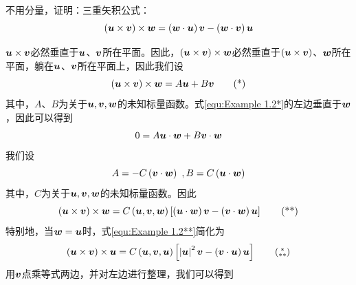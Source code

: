 \begin{example}
    不用分量，证明：三重矢积公式：
    \begin{equation}\label{equ:1.22}
        \left( \boldsymbol{u}\times \boldsymbol{v} \right) \times \boldsymbol{w}=\left( \boldsymbol{w}\cdot \boldsymbol{u} \right) \boldsymbol{v}-\left( \boldsymbol{w}\cdot \boldsymbol{v} \right) \boldsymbol{u}
    \end{equation}
\end{example}
\begin{solution}
    $\boldsymbol{u}\times \boldsymbol{v}$必然垂直于$\boldsymbol{u}$、$\boldsymbol{v}$所在平面。因此，$\left( \boldsymbol{u}\times \boldsymbol{v} \right) \times \boldsymbol{w}$必然垂直于$\left( \boldsymbol{u}\times \boldsymbol{v} \right) $、$\boldsymbol{w}$所在平面，躺在$\boldsymbol{u}$、$\boldsymbol{v}$所在平面上，因此我们设
    \begin{equation}\label{equ:Example 1.2*}
         \left( \boldsymbol{u}\times \boldsymbol{v} \right) \times \boldsymbol{w}=A\boldsymbol{u}+B\boldsymbol{v}\tag{*}
    \end{equation}
    其中，$A$、$B$为关于$\boldsymbol{u},\boldsymbol{v},\boldsymbol{w}$的未知标量函数。式\eqref{equ:Example 1.2*}的左边垂直于$\boldsymbol{w}$，因此可以得到
    \begin{equation*}
        0=A\boldsymbol{u}\cdot \boldsymbol{w}+B\boldsymbol{v}\cdot \boldsymbol{w}
    \end{equation*}
    我们设
    \begin{equation*}
        A=-C\left( \boldsymbol{v}\cdot \boldsymbol{w} \right) \,\, ,  B=C\left( \boldsymbol{u}\cdot \boldsymbol{w} \right) 
    \end{equation*}
    其中，$C$为关于$\boldsymbol{u},\boldsymbol{v},\boldsymbol{w}$的未知标量函数。因此
    \begin{equation}\label{equ:Example 1.2**}
         \left( \boldsymbol{u}\times \boldsymbol{v} \right) \times \boldsymbol{w}=C\left( \boldsymbol{u},\boldsymbol{v},\boldsymbol{w} \right) \left[ \left( \boldsymbol{u}\cdot \boldsymbol{w} \right) \boldsymbol{v}-\left( \boldsymbol{v}\cdot \boldsymbol{w} \right) \boldsymbol{u} \right] \tag{**}
    \end{equation}
    特别地，当$\boldsymbol{w}=\boldsymbol{u}$时，式\eqref{equ:Example 1.2**}简化为
    \begin{equation}\label{equ:Example 1.2***}
         \left( \bb{u}\times \bb{v} \right) \times \bb{u}=C\left( \bb{u},\bb{v},\bb{u} \right) \left[ \left| \bb{u} \right|^2\bb{v}-\left( \bb{v}\cdot \bb{u} \right) \bb{u} \right] \tag{$\begin{subarray}{c}
            *\\
            **
        \end{subarray}$}
    \end{equation}
    用$\boldsymbol{v}$点乘等式两边，并对左边进行整理，我们可以得到
    \begin{equation}\label{equ:Example 1.2****}

\end{equation}
\end{solution}
